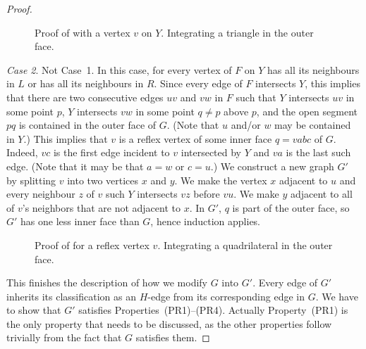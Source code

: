 \begin{proof}
	\begin{figure}[htb]
		\caption{Proof of  with a vertex
			$v$ on $Y$. Integrating a triangle in the outer face.}
	\end{figure}	
	
	{\em Case 2}. Not Case~1. 
%	
%	
	In this case, for every vertex of $F$ on $Y$ has all its
	neighbours in $L$ or has all its neighbours in $R$.  Since every
	edge of $F$ intersects $Y$, this implies that there are two
	consecutive edges $uv$ and $vw$ in $F$ such that $Y$ intersects
	$uv$ in some point $p$, $Y$ intersects $vw$ in some point $q\neq
	p$ above $p$, and the open segment $pq$ is contained in the outer
	face of $G$. (Note that $u$ and/or $w$ may be contained in $Y$.)
	This implies that $v$ is a reflex vertex of some inner face
	$q=vabc$ of $G$.  Indeed, $vc$ is the first edge incident to $v$
	intersected by $Y$ and $va$ is the last such edge.  (Note that
	it may be that $a=w$ or $c=u$.)  We construct a new graph $G'$
	by splitting $v$ into two vertices $x$ and $y$. We make the
	vertex $x$ adjacent to $u$ and every neighbour $z$ of $v$ such
	$Y$ intersects $vz$ before $vu$.  We make $y$ adjacent to all
	of $v$'s neighbors that are not adjacent to $x$.  In $G'$, $q$
	is part of the outer face, so $G'$ has one less inner face than
	$G$, hence induction applies.

	\begin{figure}
		\caption{Proof of  for a reflex
			vertex $v$. Integrating a quadrilateral in the outer face.}
	\end{figure}
	
	
	
	This finishes the description of how we modify $G$ into $G'$. Every edge of $G'$ inherits its classification as an $H$-edge from its corresponding edge in $G$. We have to show that $G'$ satisfies Properties~(PR1)--(PR4). Actually Property~(PR1) is the only property that needs to be discussed, as the other properties follow trivially from the fact that $G$ satisfies them. 
%	
%	
	

\end{proof}
